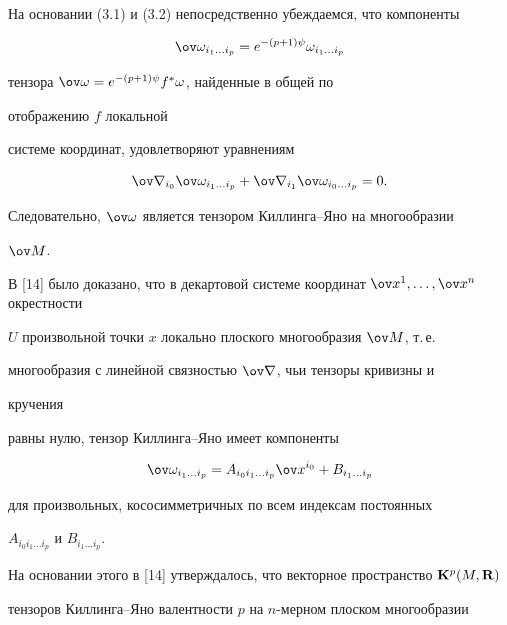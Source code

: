 На основании (3.1) и (3.2) непосредственно убеждаемся, что компоненты 


\begin{equation} 


\ov\omega_{i_1\dotsc i_p}=e^{-(p+1)\psi}\omega_{i_1\dotsc i_p} 


\end{equation} 


тензора $\ov\omega=e^{-(p+1)\psi}f^*\omega$, найденные в общей по 


отображению $f$ локальной 


системе координат, удовлетворяют уравнениям 


$$ 


\ov\nabla_{i_0}\ov\omega_{i_1\dotsc i_p}+ 


\ov\nabla_{i_1}\ov\omega_{i_0\dotsc i_p}=0. 


$$ 


Следовательно, $\ov\omega$ является тензором Киллинга--Яно на многообразии 


$\ov M$. 


 


В [14] было доказано, что в декартовой системе координат $\ov 


x^1,\dotsc,\ov x^n$ окрестности 


$U$ произвольной точки $x$ локально плоского многообразия $\ov M$, т.\,е. 


многообразия с линейной связностью $\ov\nabla$, чьи тензоры кривизны и 


кручения 


равны нулю, тензор Киллинга--Яно имеет компоненты 


\begin{equation} 


\ov\omega_{i_1\dotsc i_p}=A_{i_0i_1\dotsc i_p}\ov x^{i_0}+ 


B_{i_1\dotsc i_p} 


\end{equation} 


для произвольных, кососимметричных по всем индексам постоянных 


$A_{i_0i_1\dotsc i_p}$ и $B_{i_1\dotsc i_p}$. 


На основании этого в [14] утверждалось, что векторное пространство $\bold 


K^p(M,\bold R)$ 


тензоров Киллинга--Яно валентности $p$ на $n$-мерном плоском многообразии 


